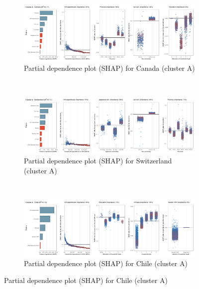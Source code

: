 \begin{figure}[ht!]\ContinuedFloat
    \centering
   \begin{subfigure}[b]{\textwidth}
         \centering
         \caption{Partial dependence plot (SHAP) for Canada (cluster A)}
         \label{fig:5b_CAN}
         \includegraphics[width=\textwidth]{Figure 5b/Figure_5b_CAN}
         \end{subfigure}
    \\
    \vspace{0.5cm}
   \begin{subfigure}[b]{\textwidth}
         \centering
         \caption{Partial dependence plot (SHAP) for Switzerland (cluster A)}
         \label{fig:5b_CHE}
         \includegraphics[width=\textwidth]{Figure 5b/Figure_5b_CHE}
         \end{subfigure}
    \\
    \vspace{0.5cm}
   \begin{subfigure}[b]{\textwidth}
         \centering
         \caption{Partial dependence plot (SHAP) for Chile (cluster A)}
         \label{fig:5b_CHL}
         \includegraphics[width=\textwidth]{Figure 5b/Figure_5b_CHL}

\end{subfigure}
\end{figure}
